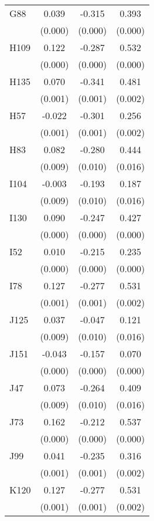 \begin{table}[htbp]
\begin{tabular}{l*{3}{c}}
G88             &    0.039&   -0.315&    0.393\\
                &  (0.000)&  (0.000)&  (0.000)\\
H109            &    0.122&   -0.287&    0.532\\
                &  (0.000)&  (0.000)&  (0.000)\\
H135            &    0.070&   -0.341&    0.481\\
                &  (0.001)&  (0.001)&  (0.002)\\
H57             &   -0.022&   -0.301&    0.256\\
                &  (0.001)&  (0.001)&  (0.002)\\
H83             &    0.082&   -0.280&    0.444\\
                &  (0.009)&  (0.010)&  (0.016)\\
I104            &   -0.003&   -0.193&    0.187\\
                &  (0.009)&  (0.010)&  (0.016)\\
I130            &    0.090&   -0.247&    0.427\\
                &  (0.000)&  (0.000)&  (0.000)\\
I52             &    0.010&   -0.215&    0.235\\
                &  (0.000)&  (0.000)&  (0.000)\\
I78             &    0.127&   -0.277&    0.531\\
                &  (0.001)&  (0.001)&  (0.002)\\
J125            &    0.037&   -0.047&    0.121\\
                &  (0.009)&  (0.010)&  (0.016)\\
J151            &   -0.043&   -0.157&    0.070\\
                &  (0.000)&  (0.000)&  (0.000)\\
J47             &    0.073&   -0.264&    0.409\\
                &  (0.009)&  (0.010)&  (0.016)\\
J73             &    0.162&   -0.212&    0.537\\
                &  (0.000)&  (0.000)&  (0.000)\\
J99             &    0.041&   -0.235&    0.316\\
                &  (0.001)&  (0.001)&  (0.002)\\
K120            &    0.127&   -0.277&    0.531\\
                &  (0.001)&  (0.001)&  (0.002)\\

\end{tabular}
\end{table}
